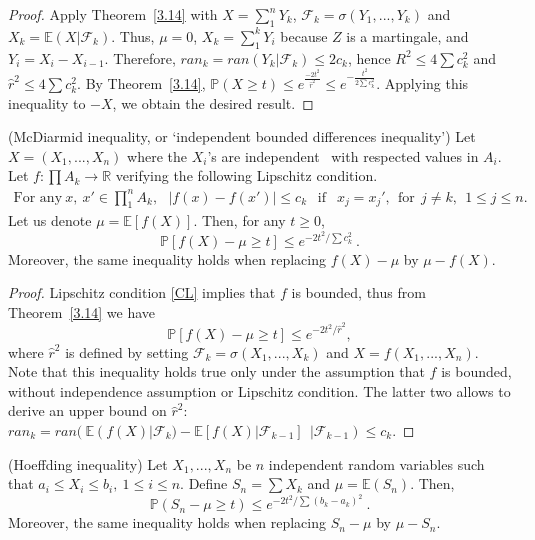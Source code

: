 \begin{proof}
Apply Theorem~\ref{3.14} with $X=\sum_{1}^{n}Y_k$, $\mathcal{F}_k=\sigma(Y_1,...,Y_k)$ and $X_k=\mathbb{E}(X|\mathcal{F}_k)$.
Thus, $\mu=0$, $X_k=\sum_{1}^{k}Y_i $ because $Z$ is a martingale, and $Y_i=X_i-X_{i-1}$.
Therefore, $ran_k=ran(Y_k|\mathcal{F}_k) \leq 2c_k$, hence $R^2 \leq 4 \sum c_k^2$ and $\hat r^2 \leq 4 \sum c_k^2$.
By Theorem~\ref{3.14}, $\mathbb{P}(X \geq t) \leq e^{\frac{-2t^2}{\hat r^2}} \leq e^{-\frac{t^2}{2\sum c_k^2}}.$
Applying this inequality to $-X$, we obtain the desired result. %
\end{proof}

\begin{proposition} ({\sc McDiarmid inequality, or `independent bounded differences inequality'})
\label{mcdiarmid}
Let $X=(X_1,...,X_n)$ where the $X_i$'s are independent \rv~with respected values in $A_i$.
Let $f : \prod A_k \rightarrow \mathbb{R}$ verifying the following Lipschitz condition.
\begin{align}
\text{For any}~ x,~x' \in \prod_{1}^{n} A_k,~~~ |f(x)-f(x')| \leq c_k ~~\text{ if }~~  x_j = x_j',~~\text{for} ~~j\neq k,~~ 1\le j\le n.
\label{CL}
\end{align} 
Let us denote $\mu=\mathbb{E}\left[f(X)\right]$.
Then, for any $t \geq 0$, %
$$ \mathbb{P}\left[f(X)-\mu \geq t\right] \leq e^{-2t^2/\sum c_k^2}~.$$ Moreover, the same inequality holds when replacing $f(X)-\mu$ by $\mu - f(X)$.
\end{proposition}


\begin{proof} Lipschitz condition \eqref{CL} implies that $f$ is bounded, thus from Theorem~\ref{3.14} we have
$$\mathbb{P}\left[f(X)-\mu \geq t\right] \leq e^{-2t^2/\hat r^2},$$ where $\hat r^2$ is defined by setting $\mathcal{F}_k=\sigma(X_1,...,X_k)$ and $X=f(X_1,...,X_n)$.
Note that this inequality holds true only under the assumption that $f$ is bounded, without independence assumption or Lipschitz condition. The latter two allows to derive an upper bound on $\hat r^2$:
$ran_k=ran(~\mathbb{E}(f(X)|\mathcal{F}_k)-\mathbb{E}\left[f(X)|\mathcal{F}_{k-1}\right]~~|\mathcal{F}_{k-1}) \leq c_k$.
\end{proof}


\begin{proposition} ({\sc Hoeffding inequality})
Let $X_1,...,X_n$ be $n$ independent random variables such that $a_i \leq X_i \leq b_i,~1\le i \le n$. Define $S_n=\sum X_k$ and $\mu=\mathbb{E}(S_n)$.
Then, $$\mathbb{P}(S_n-\mu \geq t) \leq e^{-2t^2/\sum(b_k-a_k)^2} ~.$$ Moreover, the same inequality holds when replacing $S_n-\mu$ by $\mu - S_n$.
\end{proposition}

